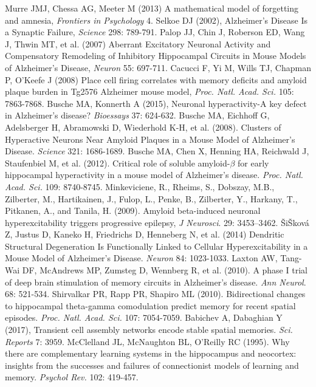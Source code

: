 \documentclass[12pt,tightenlines]{revtex4}
\begin{document}
\begin{thebibliography}{99}
 Murre JMJ, Chessa AG, Meeter M (2013) A mathematical model of forgetting and amnesia, \emph{Frontiers in Psychology} 4.
 Selkoe DJ (2002), Alzheimer's Disease Is a Synaptic Failure, \emph{Science} 298: 789-791.
 Palop JJ, Chin J, Roberson ED, Wang J, Thwin MT, et al. (2007) Aberrant Excitatory Neuronal Activity and Compensatory Remodeling of Inhibitory Hippocampal Circuits in Mouse Models of Alzheimer's Disease, \emph{Neuron} 55: 697-711.
 Cacucci F, Yi M, Wills TJ, Chapman P, O'Keefe J (2008) Place cell firing correlates with memory deficits and amyloid plaque burden in Tg2576 Alzheimer mouse model, \emph{Proc. Natl. Acad. Sci.} 105: 7863-7868.
 Busche MA, Konnerth A (2015), Neuronal hyperactivity-A key defect in Alzheimer's disease? \emph{Bioessays} 37: 624-632.
 Busche MA, Eichhoff G, Adelsberger H, Abramowski D, Wiederhold K-H, et al. (2008). Clusters of Hyperactive Neurons Near Amyloid Plaques in a Mouse Model of Alzheimer's Disease. \emph{Science} 321: 1686-1689.
 Busche MA, Chen X, Henning HA, Reichwald J, Staufenbiel M, et al. (2012). Critical role of soluble amyloid-$\beta$ for early hippocampal hyperactivity in a mouse model of Alzheimer's disease. \emph{Proc. Natl. Acad. Sci.} 109: 8740-8745.
 Minkeviciene, R., Rheims, S., Dobszay, M.B., Zilberter, M., Hartikainen, J., Fulop, L., Penke, B., Zilberter, Y., Harkany, T., Pitkanen, A., and Tanila, H. (2009). Amyloid beta-induced neuronal hyperexcitability triggers progressive epilepsy, \emph{J Neurosci}. 29: 3453–3462.
 \v{S}i\v{S}kov\'a Z, Justus D, Kaneko H, Friedrichs D, Henneberg N, et al. (2014) Dendritic Structural Degeneration Is Functionally Linked to Cellular Hyperexcitability in a Mouse Model of Alzheimer's Disease. \emph{Neuron} 84: 1023-1033.
 Laxton AW, Tang-Wai DF, McAndrews MP, Zumsteg D, Wennberg R, et al. (2010). A phase I trial of deep brain stimulation of memory circuits in Alzheimer's disease. \emph{Ann Neurol}. 68: 521-534.
 Shirvalkar PR, Rapp PR, Shapiro ML (2010). Bidirectional changes to hippocampal theta-gamma comodulation predict memory for recent spatial episodes. \emph{Proc. Natl. Acad. Sci.} 107: 7054-7059.
 Babichev A, Dabaghian Y (2017), Transient cell assembly networks encode stable spatial memories. \emph{Sci. Reports} 7: 3959. 
 McClelland JL, McNaughton BL, O'Reilly RC (1995). Why there are complementary learning systems in the hippocampus and neocortex: insights from the successes and failures of connectionist models of learning and memory. \emph{Psychol Rev.} 102: 419-457.

\end{thebibliography}
\end{document}
